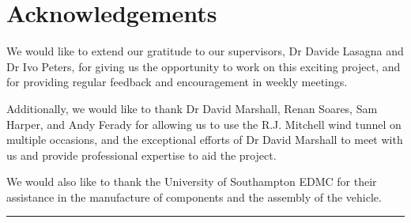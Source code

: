 \section*{Acknowledgements}

We would like to extend our gratitude to our supervisors, Dr Davide Lasagna and Dr Ivo Peters, for giving us the opportunity to work on this exciting project, and for providing regular feedback and encouragement in weekly meetings.

Additionally, we would like to thank Dr David Marshall, Renan Soares, Sam Harper, and Andy Ferady for allowing us to use the R.J. Mitchell wind tunnel on multiple occasions, and the exceptional efforts of Dr David Marshall to meet with us and provide professional expertise to aid the project.

We would also like to thank the University of Southampton EDMC for their assistance in the manufacture of components and the assembly of the vehicle.



\vspace{4cm}

\begin{center}
\rule{0.6\linewidth}{0.4pt}
\end{center}

\vspace{4cm}
